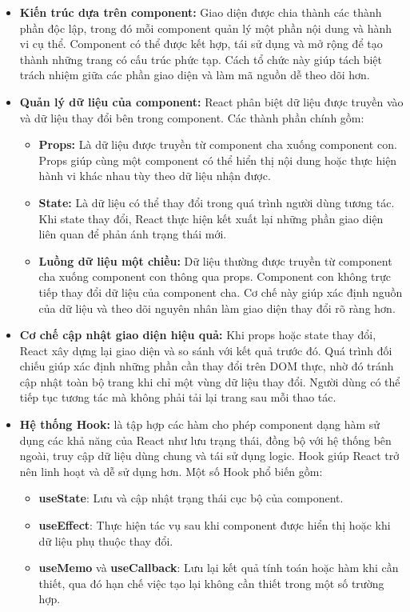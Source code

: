 \begin{itemize}
    \item \textbf{Kiến trúc dựa trên component:} Giao diện được chia thành các thành phần độc lập, trong đó mỗi component quản lý một phần nội dung và hành vi cụ thể. Component có thể được kết hợp, tái sử dụng và mở rộng để tạo thành những trang có cấu trúc phức tạp. Cách tổ chức này giúp tách biệt trách nhiệm giữa các phần giao diện và làm mã nguồn dễ theo dõi hơn.

    \item \textbf{Quản lý dữ liệu của component:} React phân biệt dữ liệu được truyền vào và dữ liệu thay đổi bên trong component. Các thành phần chính gồm:
    \begin{itemize}
        \item \textbf{Props:} Là dữ liệu được truyền từ component cha xuống component con. Props giúp cùng một component có thể hiển thị nội dung hoặc thực hiện hành vi khác nhau tùy theo dữ liệu nhận được.

        \item \textbf{State:} Là dữ liệu có thể thay đổi trong quá trình người dùng tương tác. Khi state thay đổi, React thực hiện kết xuất lại những phần giao diện liên quan để phản ánh trạng thái mới.

        \item \textbf{Luồng dữ liệu một chiều:} Dữ liệu thường được truyền từ component cha xuống component con thông qua props. Component con không trực tiếp thay đổi dữ liệu của component cha. Cơ chế này giúp xác định nguồn của dữ liệu và theo dõi nguyên nhân làm giao diện thay đổi rõ ràng hơn.
    \end{itemize}

    \item \textbf{Cơ chế cập nhật giao diện hiệu quả:} Khi props hoặc state thay đổi, React xây dựng lại giao diện và so sánh với kết quả trước đó. Quá trình đối chiếu giúp xác định những phần cần thay đổi trên DOM thực, nhờ đó tránh cập nhật toàn bộ trang khi chỉ một vùng dữ liệu thay đổi. Người dùng có thể tiếp tục tương tác mà không phải tải lại trang sau mỗi thao tác.

    \item \textbf{Hệ thống Hook:} là tập hợp các hàm cho phép component dạng hàm sử dụng các khả năng của React như lưu trạng thái, đồng bộ với hệ thống bên ngoài, truy cập dữ liệu dùng chung và tái sử dụng logic. Hook giúp React trở nên linh hoạt và dễ sử dụng hơn. Một số Hook phổ biến gồm:
    \begin{itemize}
        \item \textbf{useState}: Lưu và cập nhật trạng thái cục bộ của component.

        \item \textbf{useEffect}: Thực hiện tác vụ sau khi component được hiển thị hoặc khi dữ liệu phụ thuộc thay đổi.

        \item \textbf{useMemo} và \textbf{useCallback}: Lưu lại kết quả tính toán hoặc hàm khi cần thiết, qua đó hạn chế việc tạo lại không cần thiết trong một số trường hợp.
    \end{itemize}
\end{itemize}

